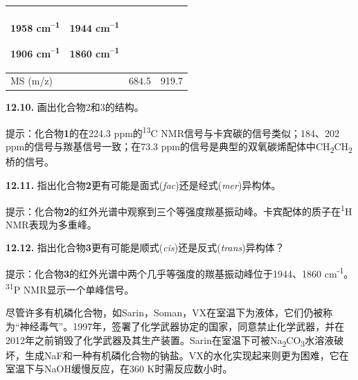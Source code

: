 \begin{longtable}[]{@{}llll@{}}
\begin{minipage}[t]{0.22\columnwidth}
		1958 cm\textsuperscript{--1}
		
		1906 cm\textsuperscript{--1}\strut
	\end{minipage} & \begin{minipage}[t]{0.22\columnwidth}\raggedright
		1944 cm\textsuperscript{--1}
		
		1860 cm\textsuperscript{--1}\strut
	\end{minipage}\tabularnewline\midrule
	MS (m/z) & & 684.5 & 919.7\tabularnewline
	\bottomrule
\end{longtable}


\noindent\textbf{12.10.} 画出化合物2和3的结构。

\noindent 提示：化合物\textbf{1}的在224.3 ppm的\textsuperscript{13}C
NMR信号与卡宾碳的信号类似；184、202 ppm的信号与羰基信号一致；在73.3
ppm的信号是典型的双氧碳烯配体中CH\textsubscript{2}CH\textsubscript{2}桥的信号。

\noindent\textbf{12.11.}
指出化合物\textbf{2}更有可能是面式(\emph{fac})还是经式(\emph{mer})异构体。

\noindent 提示：化合物\textbf{2}的红外光谱中观察到三个等强度羰基振动峰。卡宾配体的质子在\textsuperscript{1}H
NMR表现为多重峰。

\noindent\textbf{12.12.}
指出化合物\textbf{3}更有可能是顺式(\emph{cis})还是反式(\emph{trans})异构体？

\noindent 提示：化合物\textbf{3}的红外光谱中两个几乎等强度的羰基振动峰位于1944、1860
cm\textsuperscript{-1}。\textsuperscript{31}P NMR显示一个单峰信号。

尽管许多有机磷化合物，如Sarin，Soman，VX在室温下为液体，它们仍被称为``神经毒气''。1997年，签署了化学武器协定的国家，同意禁止化学武器，并在2012年之前销毁了化学武器及其生产装置。Sarin在室温下可被Na\textsubscript{2}CO\textsubscript{3}水溶液破坏，生成NaF和一种有机磷化合物的钠盐。VX的水化实现起来则更为困难，它在室温下与NaOH缓慢反应，在360 K时需反应数小时。

